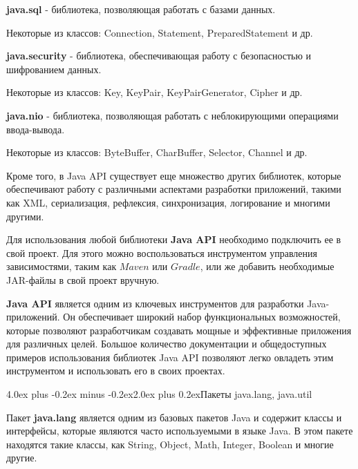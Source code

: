 \documentclass[12pt, a4paper]{book}%
\makeatletter
\renewcommand{\section}{\@startsection{section}{1}{1pt}%
{4.0ex plus -0.2ex minus -0.2ex}{2.0ex plus 0.2ex}{\centering\bf}}%
\makeatother
\begin{document}
{{\bf java.sql} - библиотека, позволяющая работать с базами данных.

Некоторые из классов: Connection, Statement, PreparedStatement и др.

{\bf java.security} - библиотека, обеспечивающая работу с безопасностью и шифрованием данных. 

Некоторые из классов: Key, KeyPair, KeyPairGenerator, Cipher и др.

{\bf java.nio} - библиотека, позволяющая работать с неблокирующими операциями ввода-вывода. 

Некоторые из классов: ByteBuffer, CharBuffer, Selector, Channel и др.

Кроме того, в Java API существует еще множество других библиотек, которые обеспечивают работу с различными аспектами разработки приложений, такими как XML, сериализация, рефлексия, синхронизация, логирование и многими другими.

Для использования любой библиотеки {\bf Java API} необходимо подключить ее в свой проект. Для этого можно воспользоваться инструментом управления зависимостями, таким как $Maven$ или $Gradle$, или же добавить необходимые JAR-файлы в свой проект вручную.

{\bf Java API} является одним из ключевых инструментов для разработки Java-приложений. Он обеспечивает широкий набор функциональных возможностей, которые позволяют разработчикам создавать мощные и эффективные приложения для различных целей. Большое количество документации и общедоступных примеров использования библиотек Java API позволяют легко овладеть этим инструментом и использовать его в своих проектах.

\section{Пакеты java.lang, java.util}

Пакет {\bf java.lang} является одним из базовых пакетов Java и содержит классы и интерфейсы, которые являются часто используемыми в языке Java. В этом пакете находятся такие классы, как String, Object, Math, Integer, Boolean и многие другие.

}
\end{document}
